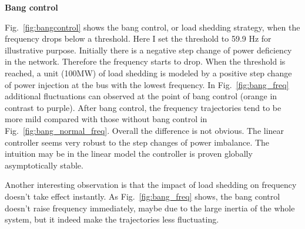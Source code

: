 \documentclass[journal,12pt,onecolumn,draftclsnofoot]{IEEEtran}
\begin{document}






%

%
%


\IEEEpeerreviewmaketitle

\noindent
\textbf{Bang control}

Fig.~\ref{fig:bangcontrol} shows the bang control, or load shedding strategy, when the frequency drops below a threshold. Here I set the threshold to 59.9 Hz for illustrative purpose. Initially there is a negative step change of power deficiency in the network. Therefore the frequency starts to drop. When the threshold is reached, a unit (100MW) of load shedding is modeled by a positive step change of power injection at the bus with the lowest frequency. In Fig.~\ref{fig:bang_freq} additional fluctuations can observed at the point of bang control (orange in contrast to purple). After bang control, the frequency trajectories tend to be more mild compared with those without bang control in Fig.~\ref{fig:bang_normal_freq}. Overall the difference is not obvious. The linear controller seems very robust to the step changes of power imbalance. The intuition may be in the linear model the controller is proven globally asymptotically stable.

Another interesting observation is that the impact of load shedding on frequency doesn't take effect instantly. As Fig.~\ref{fig:bang_freq} shows, the bang control doesn't raise frequency immediately, maybe due to the large inertia of the whole system, but it indeed make the trajectories less fluctuating.
\end{document}
